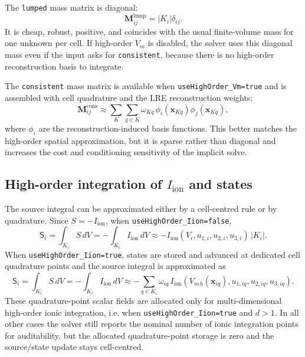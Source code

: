 \documentclass[11pt,a4paper]{article}
\newcommand{\code}[1]{\texttt{\small #1}}
\newcommand{\Vm}{V_m}
\newcommand{\Iion}{I_{\mathrm{ion}}}
\newcommand{\Mmass}{\mathbf{M}}
\begin{document}
The \code{lumped} mass matrix is diagonal:
\begin{equation}
  \Mmass^{\mathrm{lump}}_{ij}
  =
  |K_i|\delta_{ij}.
  \label{eq:lumped}
\end{equation}
It is cheap, robust, positive, and coincides with the usual finite-volume mass
for one unknown per cell. If high-order $\Vm$ is disabled, the solver uses this
diagonal mass even if the input asks for \code{consistent}, because there is no
high-order reconstruction basis to integrate.

The \code{consistent} mass matrix is available when \code{useHighOrder\_Vm=true}
and is assembled with cell quadrature and the LRE reconstruction weights:
\begin{equation}
  \Mmass^{\mathrm{cons}}_{ij}
  \approx
  \sum_{K}\sum_{q\in K}
  \omega_{Kq}\,\phi_i(\mathbf{x}_{Kq})\phi_j(\mathbf{x}_{Kq}),
  \label{eq:consistent}
\end{equation}
where $\phi_i$ are the reconstruction-induced basis functions. This better
matches the high-order spatial approximation, but it is sparse rather than
diagonal and increases the cost and conditioning sensitivity of the implicit
solve.

\subsection{High-order integration of \texorpdfstring{$\Iion$}{Iion} and states}

The source integral can be approximated either by a cell-centred rule or by
quadrature. Since $S=-\Iion$, when \code{useHighOrder\_Iion=false},
\begin{equation}
  \mathsf{S}_i=\int_{K_i} S\,dV
  =
  -\int_{K_i}\Iion\,dV
  \approx
  -\Iion(V_i,u_{1,i},u_{2,i},u_{3,i})\,|K_i|.
\end{equation}
When \code{useHighOrder\_Iion=true}, states are stored and advanced at dedicated
cell quadrature points and the source integral is approximated as
\begin{equation}
  \mathsf{S}_i=\int_{K_i} S\,dV
  =
  -\int_{K_i}\Iion\,dV
  \approx
  -\sum_{q\in K_i}\omega_{iq}\,
  \Iion
  \left(
    \Vm{}_{h}(\mathbf{x}_{iq}),
    u_{1,iq},
    u_{2,iq},
    u_{3,iq}
  \right).
  \label{eq:iion-quadrature}
\end{equation}
These quadrature-point scalar fields are allocated only for multi-dimensional
high-order ionic integration, i.e. when \code{useHighOrder\_Iion=true} and
$d>1$. In all other cases the solver still reports the nominal number of ionic
integration points for auditability, but the allocated quadrature-point storage
is zero and the source/state update stays cell-centred.
\end{document}
